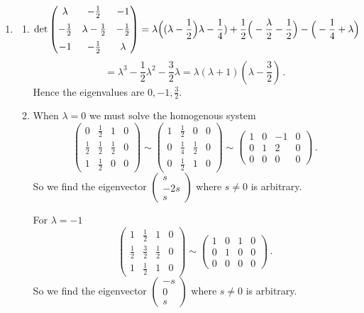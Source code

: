 \begin{enumerate}
\item 
\begin{enumerate}
\item
\[
{\rm det} \begin{pmatrix} \lambda&-\frac12 & -1 \\[2mm] -\frac12 &\lambda-\frac12 &-\frac12 \\[2mm] -1 & -\frac12 &\lambda\end{pmatrix}
=\lambda\Big((\lambda-\frac12\Big)\lambda-\frac14)+\frac12\Big(-\frac{\lambda}2-\frac12\Big)-\Big(-\frac14+\lambda\Big)
\]
\[
=\lambda^3-\frac{1}{2}\lambda^2-\frac32 \lambda=\lambda(\lambda+1)(\lambda-\frac32)\, .
\]
Hence the eigenvalues are $0,-1,\frac32$.
\item
When $\lambda=0$ we must solve the homogenous system
\[
\left(
\begin{array}{ccc|c}
0&\frac12&1&0\\[1mm]
\frac12&\frac12&\frac12&0\\[1mm]
1&\frac12&0&0
\end{array}\right)
\sim
\left(
\begin{array}{ccc|c}
1&\frac12&0&0\\[1mm]
0&\frac14&\frac12&0\\[1mm]
0&\frac12&1&0
\end{array}\right)
\sim
\left(
\begin{array}{ccc|c}
1&0&-1&0\\[1mm]
0&1&2&0\\[1mm]
0&0&0&0
\end{array}\right)\, .
\]
So we find the eigenvector $\begin{pmatrix}s\\-2s\\s\end{pmatrix}$ where $s\neq 0$ is arbitrary.

For $\lambda=-1$ 
\[
\left(
\begin{array}{ccc|c}
1&\frac12&1&0\\[1mm]
\frac12&\frac32&\frac12&0\\[1mm]
1&\frac12&1&0
\end{array}\right)
\sim
\left(
\begin{array}{ccc|c}
1&0&1&0\\[1mm]
0&1&0&0\\[1mm]
0&0&0&0
\end{array}\right)
\, .
\]
So we find the eigenvector $\begin{pmatrix}-s\\0\\s\end{pmatrix}$ where $s\neq 0$ is arbitrary.


\end{enumerate}
\end{enumerate}
